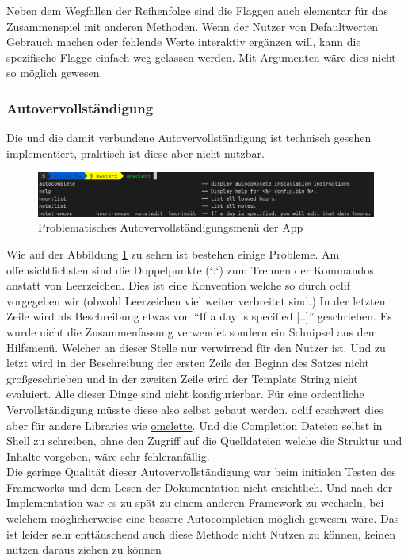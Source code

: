 \documentclass[oneside,bibliography=totocnumbered,BCOR=5mm]{scrbook}
\begin{document}
Neben dem Wegfallen der Reihenfolge sind die Flaggen auch elementar für das
Zusammenspiel mit anderen Methoden. Wenn der Nutzer von Defaultwerten Gebrauch
machen oder fehlende Werte interaktiv ergänzen will, kann die spezifische Flagge
einfach weg gelassen werden. Mit Argumenten wäre dies nicht so möglich gewesen.

\subsubsection{Autovervollständigung}
\label{sec:autocomplete}

Die  und die damit verbundene Autovervollständigung ist
technisch gesehen implementiert, praktisch ist diese aber nicht nutzbar.

\begin{figure}
  \centering
  \includegraphics[scale=0.5]{apps-autocomplete.png}
  \caption{Problematisches Autovervollständigungsmenü der App}
  \label{fig:apps-autocomplete}
\end{figure}

Wie auf der Abbildung \ref{fig:apps-autocomplete} zu sehen ist bestehen einige
Probleme. Am offensichtlichsten sind die Doppelpunkte (`:`) zum Trennen
der Kommandos anstatt von Leerzeichen. Dies ist eine Konvention welche
so durch oclif vorgegeben wir (obwohl Leerzeichen viel weiter verbreitet
sind.) In der letzten Zeile wird als Beschreibung etwas von ``If a day is
specified [..]'' geschrieben. Es wurde nicht die Zusammenfassung verwendet
sondern ein Schnipsel aus dem Hilfsmenü. Welcher an dieser Stelle nur
verwirrend für den Nutzer ist. Und zu letzt wird in der Beschreibung der
ersten Zeile der Beginn des Satzes nicht großgeschrieben und in der zweiten
Zeile wird der Template String nicht evaluiert. Alle dieser Dinge sind nicht
konfigurierbar. Für eine ordentliche Vervollständigung müsste diese also
selbst gebaut werden. oclif erschwert dies aber für andere Libraries wie
\href{https://github.com/f/omelette/issues/52}{omelette}. Und die Completion
Dateien selbst in Shell zu schreiben, ohne den Zugriff auf die Quelldateien
welche die Struktur und Inhalte vorgeben, wäre sehr fehleranfällig.
\\
Die geringe Qualität dieser Autovervollständigung war beim initialen Testen
des Frameworks und dem Lesen der Dokumentation nicht ersichtlich. Und nach
der Implementation war es zu spät zu einem anderen Framework zu wechseln, bei
welchem möglicherweise eine bessere Autocompletion möglich gewesen wäre.
Das ist leider sehr enttäuschend auch diese Methode nicht Nutzen zu können,
keinen nutzen daraus ziehen zu können %
\end{document}
